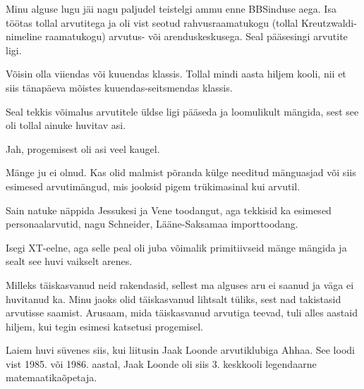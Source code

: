 
Minu alguse lugu jäi nagu paljudel teistelgi ammu enne 
BBSinduse aega. Isa töötas tollal arvutitega 
ja oli vist seotud rahvusraamatukogu (tollal 
Kreutzwaldi-nimeline raamatukogu) arvutus- või arenduskeskusega. Seal pääsesingi arvutite ligi. 


Võisin olla viiendas või kuuendas klassis. Tollal mindi aasta 
hiljem kooli, nii et siis tänapäeva mõistes kuuendas-seitsmendas klassis. 

Seal tekkis võimalus arvutitele üldse ligi pääseda ja loomulikult 
mängida, sest see oli tollal ainuke huvitav asi.


Jah, progemisest oli asi veel kaugel.

Mänge ju ei olnud. Kas olid malmist põranda külge needitud mänguasjad või siis 
esimesed arvutimängud, mis jooksid pigem trükimasinal kui 
arvutil. 


Sain natuke näppida Jessukesi ja 
Vene toodangut, aga tekkisid ka esimesed personaalarvutid, nagu 
Schneider, 
Lääne-Saksamaa importtoodang.


Isegi XT-eelne, aga selle peal oli juba võimalik primitiivseid mänge 
mängida ja sealt see huvi vaikselt arenes. 


Milleks täiskasvanud neid rakendasid, sellest ma alguses aru ei saanud ja 
väga ei huvitanud ka. Minu jaoks olid täiskasvanud lihtsalt tüliks, sest nad 
takistasid arvutisse saamist. Arusaam, mida täiskasvanud arvutiga 
teevad, tuli alles aastaid hiljem, kui tegin esimesi katsetusi 
progemisel.

Laiem huvi süvenes siis, kui liitusin Jaak 
Loonde arvutiklubiga 
Ahhaa. See loodi vist 1985. või 1986. aastal, Jaak 
Loonde oli siis 3. keskkooli legendaarne 
matemaatikaõpetaja. 

